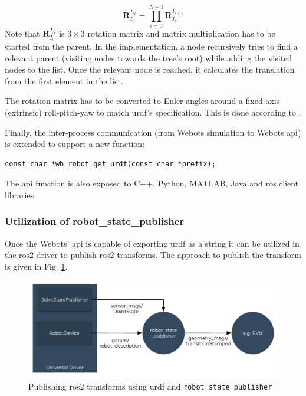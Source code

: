 \begin{equation}
    \bm{R}_{I_0}^{I_N} = \prod_{i=0}^{N-1} \bm{R}_{I_i}^{I_{i+1}}
\end{equation}
Note that $ \bm{R}_{I_0}^{I_N} $ is $ 3 \times 3 $ rotation matrix and matrix multiplication has to be started from the parent.
In the implementation, a node recursively tries to find a relevant parent (visiting nodes towards the tree's root) while adding the visited nodes to the list.
Once the relevant node is reached, it calculates the translation from the first element in the list.

The rotation matrix has to be converted to Euler angles around a fixed axis (extrinsic) roll-pitch-yaw to match \ac{urdf}'s specification. This is done according to \cite[p. 9]{eberly_euler_nodate}.

Finally, the inter-process communication (from Webots simulation to Webots \ac{api}) is extended to support a new function:

\begin{verbatim}
const char *wb_robot_get_urdf(const char *prefix);
\end{verbatim}

The \ac{api} function is also exposed to C++, Python, MATLAB, Java and \ac{ros} client libraries.

\subsubsection{Utilization of robot\_state\_publisher}

Once the Webots' \ac{api} is capable of exporting \ac{urdf} as a string it can be utilized in the \ac{ros2} driver to publish \ac{ros2} transforms.
The approach to publish the transform is given in Fig. \ref{fig:generalization:transforms_method_3}.

\begin{figure}[H]
    \centering
    \includegraphics[width=\textwidth]{generalization/figures/transforms_method_3.pdf}
    \caption{Publishing \ac{ros2} transforms using \ac{urdf} and \texttt{robot\_state\_publisher}}
    \label{fig:generalization:transforms_method_3}
\end{figure}

